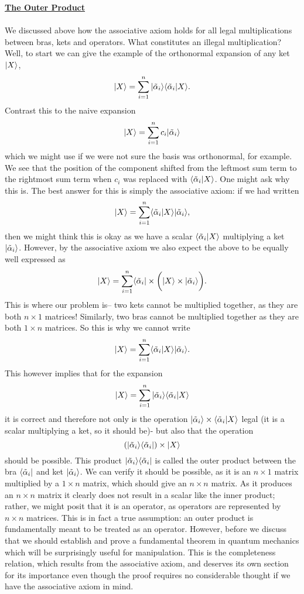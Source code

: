 \textbf{\underline{The Outer Product}}
\\\\
We discussed above how the associative axiom holds for all legal multiplications between bras, kets and operators. What constitutes an illegal multiplication? Well, to start we can give the example of the orthonormal expansion of any ket $|X\rangle$,
$$
|X\rangle=\sum_{i=1}^{n}|\tilde{\alpha}_{i}\rangle\langle\tilde{\alpha}_{i}|X\rangle.
$$
Contrast this to the naive expansion
$$
|X\rangle=\sum_{i=1}^{n}c_{i}|\tilde{\alpha}_{i}\rangle
$$
which we might use if we were not sure the basis was orthonormal, for example. We see that the position of the component shifted from the leftmost sum term to the rightmost sum term when $c_{i}$ was replaced with $\langle\tilde{\alpha}_{i}|X\rangle$. One might ask why this is. The best answer for this is simply the associative axiom: if we had written 
$$
|X\rangle=\sum_{i=1}^{n}\langle\tilde{\alpha}_{i}|X\rangle|\tilde{\alpha}_{i}\rangle,
$$
then we might think this is okay as we have a scalar $\langle\tilde{\alpha}_{i}|X\rangle$ multiplying a ket $|\tilde{\alpha}_{i}\rangle$. However, by the associative axiom we also expect the above to be equally well expressed as 
$$
|X\rangle=\sum_{i=1}^{n} \langle\tilde{\alpha}_{i}|\times\biggl(|X\rangle\times|\tilde{\alpha}_{i}\rangle\biggr).
$$ 
This is where our problem is-- two kets cannot be multiplied together, as they are both $n\times 1$ matrices! Similarly, two bras cannot be multiplied together as they are both $1\times n$ matrices. So this is why we cannot write
$$
|X\rangle=\sum_{i=1}^{n}\langle\tilde{\alpha}_{i}|X\rangle|\tilde{\alpha}_{i}\rangle.
$$
This however implies that for the expansion
$$
|X\rangle=\sum_{i=1}^{n}|\tilde{\alpha}_{i}\rangle\langle\tilde{\alpha}_{i}|X\rangle
$$
it is correct and therefore not only is the operation $|\tilde{\alpha}_{i}\rangle\times\langle\tilde{\alpha}_{i}|X\rangle$ legal (it is a scalar multiplying a ket, so it should be)- but also that the operation
$$
\left(|\tilde{\alpha}_{i}\rangle\langle\tilde{\alpha}_{i}|\right)\times |X\rangle
$$
should be possible. This product $|\tilde{\alpha}_{i}\rangle\langle\tilde{\alpha}_{i}|$ is called the outer product between the bra $\langle\tilde{\alpha}_{i}|$ and ket $|\tilde{\alpha}_{i}\rangle$. We can verify it should be possible, as it is an $n\times 1$ matrix multiplied by a $1\times n$ matrix, which should give an $n\times n$ matrix. As it produces an $n\times n$ matrix it clearly does not result in a scalar like the inner product; rather, we might posit that it is an operator, as operators are represented  by $n\times n$ matrices. This is in fact a true assumption: an outer product is fundamentally meant to be treated as an operator. However, before we discuss that we should establish and prove a fundamental theorem in quantum mechanics which will be surprisingly useful for manipulation. This is the completeness relation, which results from the associative axiom, and deserves its own section for its importance even though the proof requires no considerable thought if we have the associative axiom in mind.
